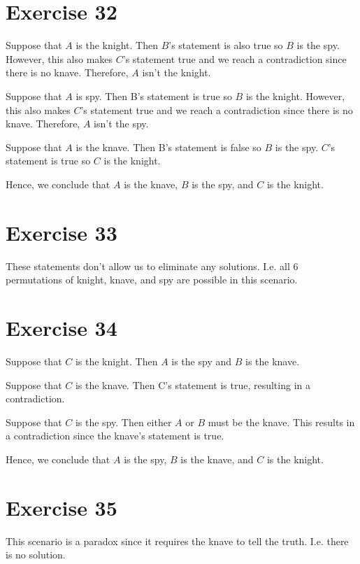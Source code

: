 \documentclass{article}
\begin{document}
\pagebreak

\section{Exercise 32}
Suppose that $A$ is the knight. Then $B$'s statement is also true so $B$ is the spy. However, this also makes $C$'s statement true and we reach a contradiction since there is no knave. Therefore, $A$ isn't the knight.

Suppose that $A$ is spy. Then B's statement is true so $B$ is the knight. However, this also makes $C$'s statement true and we reach a contradiction since there is no knave. Therefore, $A$ isn't the spy.

Suppose that $A$ is the knave. Then B's statement is false so $B$ is the spy. $C$'s statement is true so $C$ is the knight.

Hence, we conclude that $A$ is the knave, $B$ is the spy, and $C$ is the knight.

\pagebreak

\section{Exercise 33}
These statements don't allow us to eliminate any solutions. I.e. all 6 permutations of knight, knave, and spy are possible in this scenario.

\pagebreak

\section{Exercise 34}
Suppose that $C$ is the knight. Then $A$ is the spy and $B$ is the knave.

Suppose that $C$ is the knave. Then C's statement is true, resulting in a contradiction.

Suppose that $C$ is the spy. Then either $A$ or $B$ must be the knave. This results in a contradiction since the knave's statement is true.

Hence, we conclude that $A$ is the spy, $B$ is the knave, and $C$ is the knight.

\pagebreak

\section{Exercise 35}
This scenario is a paradox since it requires the knave to tell the truth. I.e. there is no solution.
\end{document}

